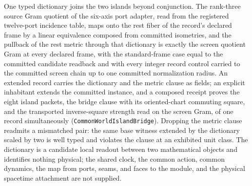\documentclass[11pt]{article}
\begin{document}
One typed dictionary joins the two islands beyond conjunction. The
rank-three source Gram quotient of the six-axis port adapter, read from the
registered twelve-port incidence table, maps onto the rest fiber of the
record's declared frame by a linear equivalence composed from committed
isometries, and the pullback of the rest metric through that dictionary is
exactly the screen quotient Gram at every declared frame, with the
standard-frame case equal to the committed candidate readback and with
every integer record control carried to the committed screen chain up to
one committed normalization radius. An extended record carries the
dictionary and the metric clause as fields; an explicit inhabitant extends
the committed instance, and a composed receipt proves the eight island
packets, the bridge clause with its oriented-chart commuting square, and
the transported inverse-square strength read on the screen Gram, of one
record simultaneously
(\texttt{CommonWorldIslandBridge}). Dropping the metric
clause readmits a mismatched pair: the same base witness extended by the
dictionary scaled by two is well typed and violates the clause at an
exhibited unit class. The dictionary is a candidate local readout between
two mathematical objects and identifies nothing physical; the shared clock,
the common action, common dynamics, the map from ports, seams, and faces to
the module, and the physical spacetime attachment are not supplied.
\end{document}
